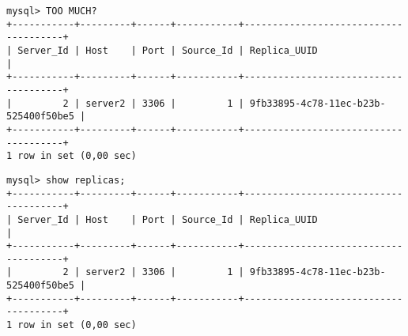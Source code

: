 \documentclass[12pt,a4paper,openany]{book}
\begin{document}
\begin{tcolorbox}[arc=3mm,colback=solarizeddark,title=Código original,capture=minipage]
\begin{verbatim}
mysql> TOO MUCH?
+-----------+---------+------+-----------+--------------------------------------+
| Server_Id | Host    | Port | Source_Id | Replica_UUID                         |
+-----------+---------+------+-----------+--------------------------------------+
|         2 | server2 | 3306 |         1 | 9fb33895-4c78-11ec-b23b-525400f50be5 |
+-----------+---------+------+-----------+--------------------------------------+
1 row in set (0,00 sec)
\end{verbatim}
\end{tcolorbox}




\begin{tcolorbox}[arc=3mm,colback=solarizeddark,title=Código con letra cambiada,capture=minipage]
\begin{verbatim}
mysql> show replicas;
+-----------+---------+------+-----------+--------------------------------------+
| Server_Id | Host    | Port | Source_Id | Replica_UUID                         |
+-----------+---------+------+-----------+--------------------------------------+
|         2 | server2 | 3306 |         1 | 9fb33895-4c78-11ec-b23b-525400f50be5 |
+-----------+---------+------+-----------+--------------------------------------+
1 row in set (0,00 sec)
\end{verbatim}
\end{tcolorbox}






\begin{tcbraster}[colback=green!10!white,boxsep=1mm]
\tcboxfit[height=4cm]{\Blindtext[3]}

\end{tcbraster}


\tcboxfit[height=4cm,title=With a title]{\Blindtext[3]}


\begin{tcolorbox}[fit to height=2cm,colback=red!5!white, colframe=red!75!black,left=1mm, right=1mm,boxsep=0mm]%
\lipsum[1]
\end{tcolorbox}
\end{document}
